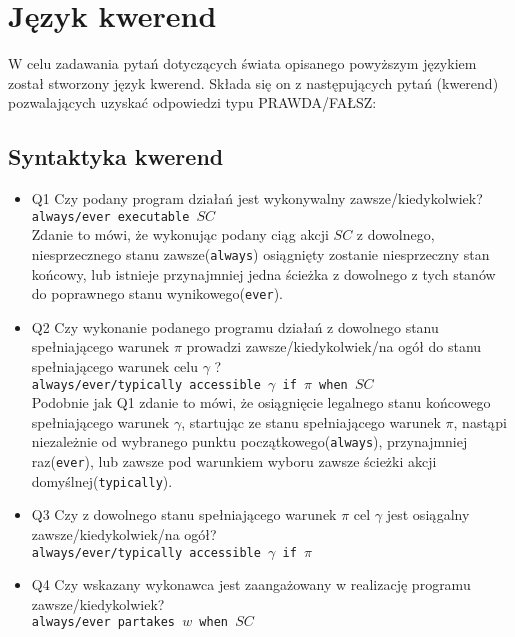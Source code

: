 \documentclass{article}
\begin{document}
\section{Język kwerend}
W celu zadawania pytań dotyczących świata opisanego powyższym językiem został stworzony język kwerend. Składa się on z następujących pytań (kwerend) pozwalających uzyskać odpowiedzi typu PRAWDA/FAŁSZ:

\subsection{Syntaktyka kwerend}
\begin{itemize}
\item Q1 Czy podany program działań jest wykonywalny zawsze/kiedykolwiek?\\
{\large\texttt{always/ever executable $SC$}} \\
Zdanie to mówi, że wykonując podany ciąg akcji $SC$ z dowolnego, niesprzecznego stanu zawsze(\texttt{always}) osiągnięty zostanie niesprzeczny stan końcowy, lub istnieje przynajmniej jedna ścieżka z dowolnego z tych stanów do poprawnego stanu wynikowego(\texttt{ever}).


\item Q2 Czy wykonanie podanego programu działań z dowolnego stanu spełniającego warunek $\pi$ prowadzi zawsze/kiedykolwiek/na ogół do stanu spełniającego warunek celu $\gamma$ ?\\
{\large\texttt{always/ever/typically accessible $\gamma$ if $\pi$ when $SC$}} \\
Podobnie jak Q1 zdanie to mówi, że osiągnięcie legalnego stanu końcowego spełniającego warunek $\gamma$, startując ze stanu spełniającego warunek $\pi$, nastąpi niezależnie od wybranego punktu początkowego(\texttt{always}), przynajmniej raz(\texttt{ever}), lub zawsze pod warunkiem wyboru zawsze ścieżki akcji domyślnej(\texttt{typically}).



\item Q3 Czy z dowolnego stanu spełniającego warunek $\pi$ cel $\gamma$ jest osiągalny zawsze/kiedykolwiek/na ogół?\\
{\large\texttt{always/ever/typically accessible $\gamma$ if $\pi$}}


\item Q4 Czy wskazany wykonawca jest zaangażowany w realizację programu zawsze/kiedykolwiek?\\
{\large\texttt{always/ever partakes $w$ when $SC$}} \\

\end{itemize}
\end{document}
